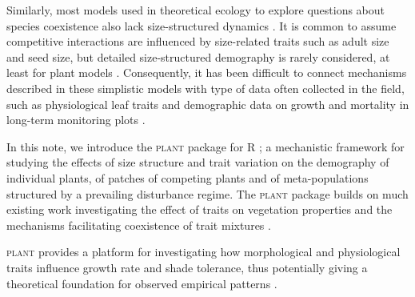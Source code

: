 \documentclass[a4paper,11pt]{article}
\newcommand{\plant}{\textsc{plant}}
\begin{document}
Similarly, most models used in theoretical ecology to explore
questions about species coexistence also lack size-structured dynamics
\citep[e.g.][]{MacArthur-1967,Levin-1974,Tilman-1985,Geritz-1995, 
Calcagno-2006, Leimar-2013}.  It is common to assume
competitive interactions are influenced by size-related traits such as
adult size and seed size, but detailed size-structured demography is
rarely considered, at least for plant models \cite[for animal
examples, see][]{Deroos-1988, Deroos-1992}. Consequently, it has been
difficult to connect mechanisms described in these simplistic models
with type of data often collected in the field, such as physiological
leaf traits and demographic data on growth and mortality in long-term
monitoring plots \citep{Adler-2013}.

In this note, we introduce the {\plant} package for R \citep{R-2015};
a mechanistic framework for studying the effects of size structure and
trait variation on the demography of individual plants, of patches of
competing plants and of meta-populations structured by a prevailing
disturbance regime.
%
The {\plant} package builds on much existing work investigating the
effect of traits on vegetation properties and the mechanisms
facilitating coexistence of trait mixtures
\citep{Kohyama-1993,Deroos-1997,Moorcroft-2001,Falster-2011,Falster-2015}.

{\plant} provides a platform for investigating how morphological and
physiological traits influence growth rate and shade tolerance, thus
potentially giving a theoretical foundation for observed empirical
patterns \citep{Baltzer-2007,Wright-2010}.
\end{document}
